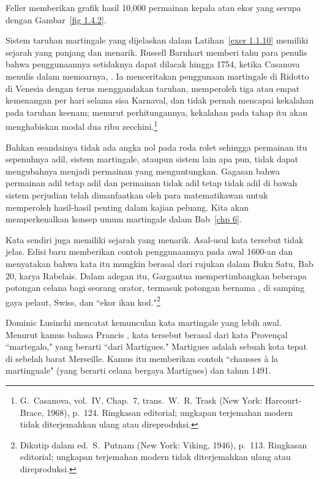 \noindent Feller memberikan grafik hasil 10{,}000 permainan \emx
{kepala atau ekor} yang serupa dengan Gambar~\ref{fig 1.4.2}.

Sistem taruhan martingale 
yang dijelaskan dalam Latihan~\ref{exer 1.1.10} 
memiliki sejarah yang panjang dan menarik.  Russell Barnhart memberi tahu para
penulis bahwa penggunaannya setidaknya dapat dilacak hingga 1754, ketika Casanova
menulis dalam memoarnya, . Ia menceritakan penggunaan
martingale di Ridotto di Venesia dengan terus menggandakan taruhan, memperoleh
tiga atau empat kemenangan per hari selama sisa Karnaval, dan tidak pernah
mencapai kekalahan pada taruhan keenam; menurut perhitungannya, kekalahan pada
tahap itu akan menghabiskan modal dua ribu zecchini.\footnote{G.~Casanova,
 vol.~IV, Chap.~7, trans.\ W.~R. Trask (New York:
Harcourt-Brace, 1968), p.~124. Ringkasan editorial; ungkapan terjemahan modern
tidak diterjemahkan ulang atau direproduksi.}

Bahkan seandainya tidak ada angka nol pada roda rolet sehingga permainan itu sepenuhnya
adil, sistem martingale, ataupun sistem lain apa pun, tidak dapat mengubahnya
menjadi permainan yang menguntungkan.  Gagasan bahwa permainan adil tetap adil dan
permainan tidak adil tetap tidak adil di bawah sistem perjudian telah dimanfaatkan oleh para matematikawan 
untuk memperoleh hasil-hasil penting dalam kajian peluang.  Kita akan memperkenalkan konsep umum 
martingale dalam Bab~\ref{chp 6}.

Kata  sendiri juga memiliki sejarah yang 
menarik.  Asal-usul kata tersebut tidak jelas.  Edisi baru  memberikan contoh
penggunaannya pada awal 1600-an dan menyatakan bahwa kata itu mungkin berasal dari rujukan
dalam Buku Satu, Bab 20, karya Rabelais. Dalam adegan itu,
Gargantua mempertimbangkan beberapa potongan celana bagi seorang orator,
termasuk potongan bernama , di samping gaya pelaut, Swiss, dan
``ekor ikan kod."\footnote{Dikutip dalam 
ed.~S.~Putnam (New York: Viking, 1946), p.~113. Ringkasan editorial; ungkapan
terjemahan modern tidak diterjemahkan ulang atau direproduksi.}

Dominic Lusinchi mencatat kemunculan kata martingale yang lebih awal.  Menurut kamus bahasa Prancis ,
kata tersebut berasal dari kata Proven\c{c}al ``martegalo," yang berarti ``dari Martigues."  Martigues adalah sebuah kota tepat di sebelah barat Merseille.  Kamus itu memberikan contoh ``chausses \`{a} la martinguale" (yang berarti celana bergaya Martigues) dan tahun 1491.  

